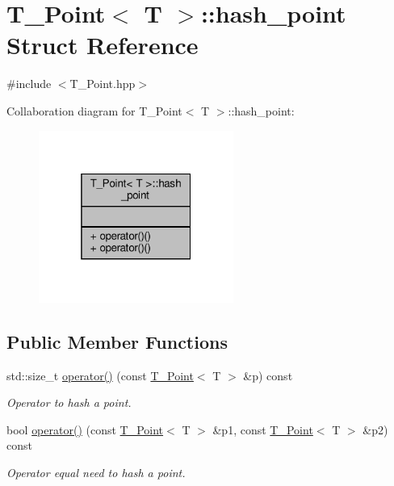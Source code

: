 \hypertarget{structT__Point_1_1hash__point}{}\section{T\+\_\+\+Point$<$ T $>$\+:\+:hash\+\_\+point Struct Reference}
\label{structT__Point_1_1hash__point}


{\ttfamily \#include $<$T\+\_\+\+Point.\+hpp$>$}



Collaboration diagram for T\+\_\+\+Point$<$ T $>$\+:\+:hash\+\_\+point\+:\nopagebreak
\begin{figure}[H]
\begin{center}
\leavevmode
\includegraphics[width=181pt]{structT__Point_1_1hash__point__coll__graph}
\end{center}
\end{figure}
\subsection*{Public Member Functions}
\begin{DoxyCompactItemize}
\item 
std\+::size\+\_\+t \hyperlink{structT__Point_1_1hash__point_a6d41490eb7af074b029db524a80e2e53}{operator()} (const \hyperlink{classT__Point}{T\+\_\+\+Point}$<$ T $>$ \&p) const
\begin{DoxyCompactList}\small\item\em Operator to hash a point. \end{DoxyCompactList}\item 
bool \hyperlink{structT__Point_1_1hash__point_a92f4c83c6538fcb66804d44e944d7b20}{operator()} (const \hyperlink{classT__Point}{T\+\_\+\+Point}$<$ T $>$ \&p1, const \hyperlink{classT__Point}{T\+\_\+\+Point}$<$ T $>$ \&p2) const
\begin{DoxyCompactList}\small\item\em Operator equal need to hash a point. \end{DoxyCompactList}\end{DoxyCompactItemize}


